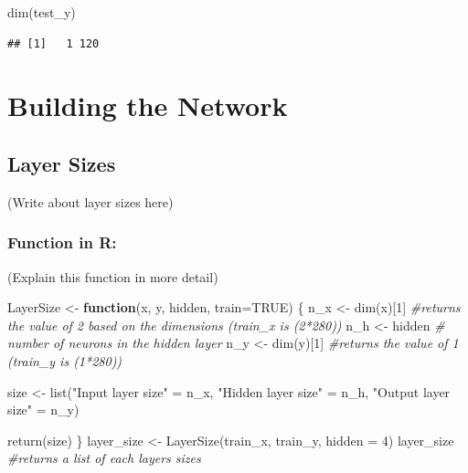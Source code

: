 \documentclass[
]{article}
\newenvironment{Shaded}{\begin{snugshade}}{\end{snugshade}}
\newcommand{\AttributeTok}[1]{\textcolor[rgb]{0.77,0.63,0.00}{#1}}
\newcommand{\CommentTok}[1]{\textcolor[rgb]{0.56,0.35,0.01}{\textit{#1}}}
\newcommand{\ConstantTok}[1]{\textcolor[rgb]{0.00,0.00,0.00}{#1}}
\newcommand{\ControlFlowTok}[1]{\textcolor[rgb]{0.13,0.29,0.53}{\textbf{#1}}}
\newcommand{\DecValTok}[1]{\textcolor[rgb]{0.00,0.00,0.81}{#1}}
\newcommand{\FunctionTok}[1]{\textcolor[rgb]{0.00,0.00,0.00}{#1}}
\newcommand{\NormalTok}[1]{#1}
\newcommand{\OtherTok}[1]{\textcolor[rgb]{0.56,0.35,0.01}{#1}}
\newcommand{\StringTok}[1]{\textcolor[rgb]{0.31,0.60,0.02}{#1}}
\begin{document}
\begin{Shaded}
\begin{Highlighting}[]
\FunctionTok{dim}\NormalTok{(test\_y)}
\end{Highlighting}
\end{Shaded}

\begin{verbatim}
## [1]   1 120
\end{verbatim}

\hypertarget{building-the-network}{%
\section{Building the Network}\label{building-the-network}}

\hypertarget{layer-sizes}{%
\subsection{Layer Sizes}\label{layer-sizes}}

(Write about layer sizes here)

\hypertarget{function-in-r}{%
\subsubsection{Function in R:}\label{function-in-r}}

(Explain this function in more detail)

\begin{Shaded}
\begin{Highlighting}[]
\NormalTok{LayerSize }\OtherTok{\textless{}{-}} \ControlFlowTok{function}\NormalTok{(x, y, hidden, }\AttributeTok{train=}\ConstantTok{TRUE}\NormalTok{) \{}
\NormalTok{  n\_x }\OtherTok{\textless{}{-}} \FunctionTok{dim}\NormalTok{(x)[}\DecValTok{1}\NormalTok{]  }\CommentTok{\#returns the value of 2 based on the dimensions (train\_x is (2*280))}
\NormalTok{  n\_h }\OtherTok{\textless{}{-}}\NormalTok{ hidden     }\CommentTok{\# number of neurons in the hidden layer}
\NormalTok{  n\_y }\OtherTok{\textless{}{-}} \FunctionTok{dim}\NormalTok{(y)[}\DecValTok{1}\NormalTok{]  }\CommentTok{\#returns the value of 1 (train\_y is (1*280))}
  
\NormalTok{  size }\OtherTok{\textless{}{-}} \FunctionTok{list}\NormalTok{(}\StringTok{"Input layer size"} \OtherTok{=}\NormalTok{ n\_x,}
               \StringTok{"Hidden layer size"} \OtherTok{=}\NormalTok{ n\_h,}
               \StringTok{"Output layer size"} \OtherTok{=}\NormalTok{ n\_y)}
  
  \FunctionTok{return}\NormalTok{(size)}
\NormalTok{\}}
\NormalTok{layer\_size }\OtherTok{\textless{}{-}} \FunctionTok{LayerSize}\NormalTok{(train\_x, train\_y, }\AttributeTok{hidden =} \DecValTok{4}\NormalTok{)}
\NormalTok{layer\_size }\CommentTok{\#returns a list of each layers\textquotesingle{} sizes}
\end{Highlighting}
\end{Shaded}
\end{document}
